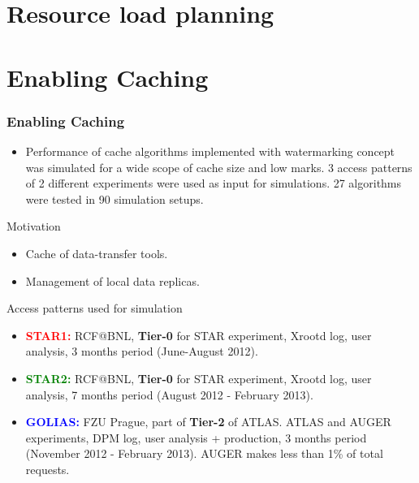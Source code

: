 \documentclass{beamer}
\begin{document}
\section{Resource load planning}

\section{Enabling Caching}

\begin{frame}\frametitle{Enabling Caching}
\begin{block}{}
\vspace{-5mm}
    \begin{itemize}
        \item Performance of cache algorithms implemented with watermarking concept was simulated for a wide scope of cache size and low marks. 3 access patterns of 2 different experiments were used as input for simulations. 27 algorithms were tested in 90 simulation setups.        
    \end{itemize}
\end{block} 
\vspace{-2mm}
\begin{block}{Motivation}
    \begin{itemize}
        \item Cache of data-transfer tools.   
        \item Management of local data replicas. 
    \end{itemize}
   
\end{block}    


\begin{footnotesize}
\vspace{-2mm}
\begin{block}{Access patterns used for simulation}
\begin{itemize}
	\item[]\textbf{\textcolor{red}{STAR1:}} RCF@BNL, \textbf{Tier-0} for STAR experiment, Xrootd log, user analysis,  3 months period (June-August 2012).

	\item[]\textbf{\textcolor{green}{STAR2:}} RCF@BNL, \textbf{Tier-0} for STAR experiment, Xrootd log, user analysis, 7 months period (August 2012 - February  2013).

	\item[]\textbf{\textcolor{blue}{GOLIAS:}} FZU Prague, part of \textbf{Tier-2} of ATLAS. ATLAS and AUGER experiments, DPM log, user analysis + production,  3 months period (November 2012 - February  2013). AUGER makes less than  1\% of total requests.
\end{itemize}
\end{block}
\end{footnotesize}            
\end{frame}
\end{document}
